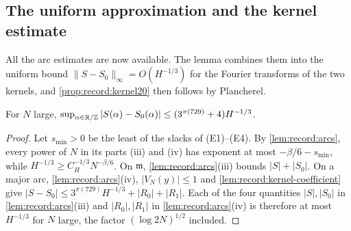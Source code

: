 \subsection{The uniform approximation and the kernel estimate}

All the arc estimates are now available. The lemma combines them
into the uniform bound $\|S-S_0\|_\infty=O(H^{-1/3})$ for the
Fourier transforms of the two kernels, and
\cref{prop:record:kernel20} then follows by Plancherel.

\begin{lemma}\label{lem:record:K20-approx}
For $N$ large,
$\sup_{\alpha\in\mathbb R/\mathbb Z}|S(\alpha)-S_0(\alpha)|\le(3^{\pi(729)}+4)H^{-1/3}$.
\end{lemma}

\begin{proof}
Let $s_{\min}>0$ be the least of the slacks of (E1)--(E4). By
\cref{lem:record:arcs}, every power of $N$ in its parts (iii) and (iv) has
exponent at most $-\beta/6-s_{\min}$, while $H^{-1/3}\ge C_H^{-1/3}N^{-\beta/6}$.
On $\mathfrak m$, \cref{lem:record:arcs}(iii) bounds $|S|+|S_0|$. On a major
arc, \cref{lem:record:arcs}(iv), $|V_N(y)|\le1$ and
\cref{lem:record:kernel-coefficient} give
$|S-S_0|\le3^{\pi(729)}H^{-1/3}+|R_0|+|R_1|$. Each of the four quantities $|S|,|S_0|$ in \cref{lem:record:arcs}(iii) and $|R_0|,|R_1|$ in \cref{lem:record:arcs}(iv) is therefore at most $H^{-1/3}$ for $N$ large, the factor
$(\log2N)^{1/2}$ included.
\end{proof}

